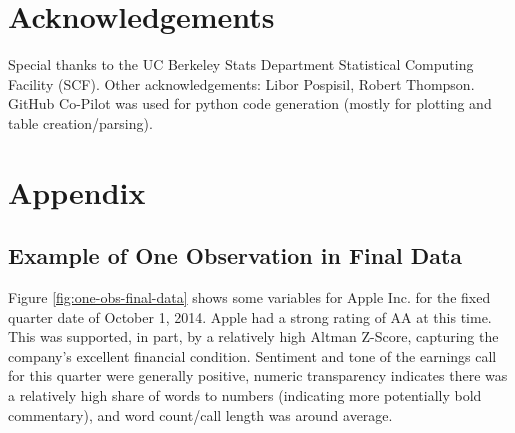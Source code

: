\documentclass{article}[11pt]
\begin{document}
    \section*{Acknowledgements}

    Special thanks to the UC Berkeley Stats Department Statistical Computing Facility (SCF). Other acknowledgements: Libor Pospisil, Robert Thompson. GitHub Co-Pilot was used for python code generation (mostly for plotting and table creation/parsing).

    \clearpage
    \newpage

    
    

    \clearpage
    \newpage

    \appendix


    \section{Appendix}

    \subsection{Example of One Observation in Final Data}

    \label{sec:one-obs-final-data}

    Figure \ref{fig:one-obs-final-data} shows some variables for Apple Inc. for the fixed quarter date of October 1, 2014. Apple had a strong rating of AA at this time. This was supported, in part, by a relatively high Altman Z-Score, capturing the company's excellent financial condition. Sentiment and tone of the earnings call for this quarter were generally positive, numeric transparency indicates there was a relatively high share of words to numbers (indicating more potentially bold commentary), and word count/call length was around average.
\end{document}
